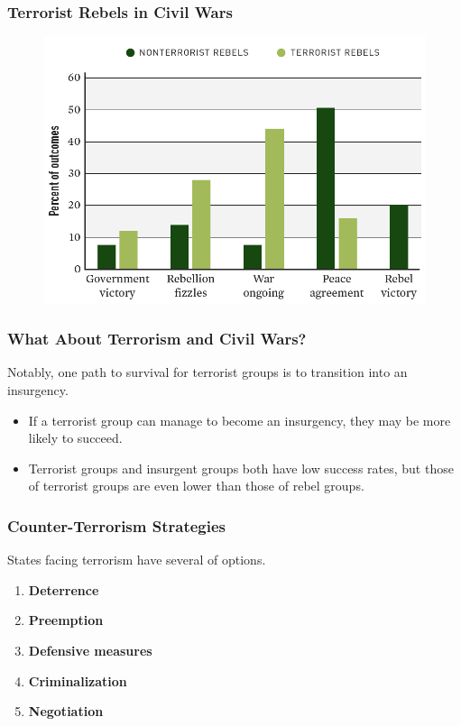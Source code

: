 \documentclass{beamer}
\begin{document}
\begin{frame} 
\frametitle{\LARGE{Terrorist Rebels in Civil Wars}}
\begin{figure}[ht!]
	\centering
	\includegraphics[width=\textwidth,height=0.8\textheight,keepaspectratio]{./terr_success.png}
\end{figure}
\end{frame}

\begin{frame} 
	\frametitle{\LARGE{What About Terrorism and Civil Wars?}}
Notably, one path to survival for terrorist groups is to transition into an insurgency.
	\begin{itemize}
		\item If a terrorist group can manage to become an insurgency, they may be more likely to succeed. \pause
		\item Terrorist groups and insurgent groups both have low success rates, but those of terrorist groups are even lower than those of rebel groups. 
	\end{itemize}
\end{frame}

\begin{frame} 
	\frametitle{\LARGE{Counter-Terrorism Strategies}}
	States facing terrorism have several of options.
	\begin{enumerate}
		\item \textbf{Deterrence}
		\item \textbf{Preemption}
		\item \textbf{Defensive measures}
		\item \textbf{Criminalization} 
		\item \textbf{Negotiation}
	\end{enumerate}
\end{frame}
\end{document}
